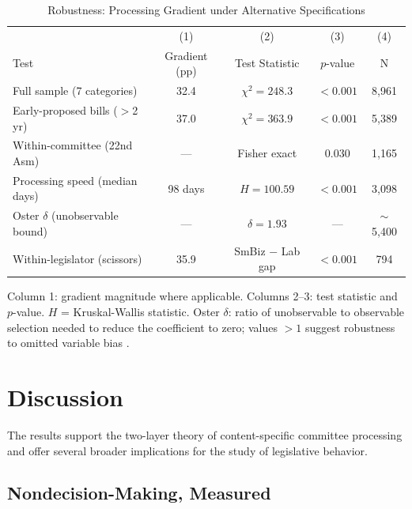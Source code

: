 \documentclass[11pt]{article}
\begin{document}
\begin{table}[htbp]
\centering
\begin{threeparttable}
\caption{Robustness: Processing Gradient under Alternative Specifications}
\label{tab:robust}
\begin{tabular}{lcccc}
\toprule
& (1) & (2) & (3) & (4) \\
Test & Gradient (pp) & Test Statistic & $p$-value & N \\
\midrule
Full sample (7 categories)             & 32.4 & $\chi^2 = 248.3$         & $< 0.001$ & 8,961 \\
Early-proposed bills ($>$2 yr)         & 37.0 & $\chi^2 = 363.9$         & $< 0.001$ & 5,389 \\
Within-committee (22nd Asm)            & ---  & Fisher exact              & 0.030     & 1,165 \\
Processing speed (median days)         & 98 days & $H = 100.59$          & $< 0.001$ & 3,098 \\
Oster $\delta$ (unobservable bound)    & ---  & $\delta = 1.93$          & ---       & $\sim$5,400 \\
Within-legislator (scissors)           & 35.9 & SmBiz $-$ Lab gap        & $< 0.001$ & 794 \\
\bottomrule
\end{tabular}
\begin{tablenotes}
\footnotesize
\item Column 1: gradient magnitude where applicable. Columns 2--3: test statistic and $p$-value. $H$ = Kruskal-Wallis statistic. Oster $\delta$: ratio of unobservable to observable selection needed to reduce the coefficient to zero; values $> 1$ suggest robustness to omitted variable bias \citep{oster2019}.
\end{tablenotes}
\end{threeparttable}
\end{table}

\section{Discussion}
\label{sec:discussion}

The results support the two-layer theory of content-specific committee processing and offer several broader implications for the study of legislative behavior.

\subsection{Nondecision-Making, Measured}
\end{document}
